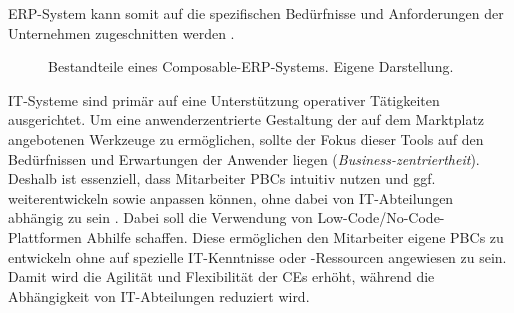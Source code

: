 ERP-System kann somit auf die spezifischen Bedürfnisse und Anforderungen der Unternehmen zugeschnitten werden \cite{.20230313}.
\begin{center}
	\begin{figure}[H]
		\centering
		\caption[Bestandteile eines Composable-ERP-Systems]{Bestandteile eines Composable-ERP-Systems. Eigene Darstellung.}
		\label{fig:CERP}
	\end{figure}	
\end{center}
\vspace*{-15mm}
IT-Systeme sind primär auf eine Unterstützung operativer Tätigkeiten ausgerichtet. Um eine anwenderzentrierte Gestaltung der auf dem Marktplatz angebotenen Werkzeuge zu ermöglichen, sollte der Fokus dieser Tools auf den Bedürfnissen und Erwartungen der Anwender liegen (\textit{Business-zentriertheit}). Deshalb ist essenziell, dass Mitarbeiter PBCs intuitiv nutzen und ggf. weiterentwickeln sowie anpassen können, ohne dabei von IT-Abteilungen abhängig zu sein \cite{.20230313}. Dabei soll die Verwendung von Low-Code/No-Code-Plattformen Abhilfe schaffen. Diese ermöglichen den Mitarbeiter eigene PBCs zu entwickeln ohne auf spezielle IT-Kenntnisse oder -Ressourcen angewiesen zu sein. Damit wird die Agilität und Flexibilität der CEs erhöht, während die Abhängigkeit von IT-Abteilungen reduziert wird.

